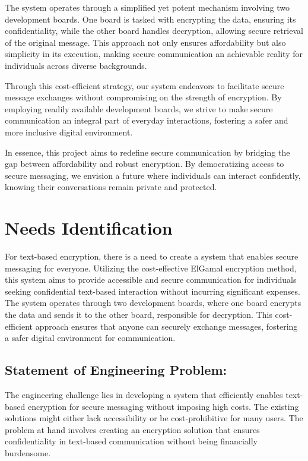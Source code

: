 \documentclass[12pt]{article}
\begin{document}
The system operates through a simplified yet potent mechanism involving two development boards. One board is tasked with encrypting the data, ensuring its confidentiality, while the other board handles decryption, allowing secure retrieval of the original message. This approach not only ensures affordability but also simplicity in its execution, making secure communication an achievable reality for individuals across diverse backgrounds.

Through this cost-efficient strategy, our system endeavors to facilitate secure message exchanges without compromising on the strength of encryption. By employing readily available development boards, we strive to make secure communication an integral part of everyday interactions, fostering a safer and more inclusive digital environment.

In essence, this project aims to redefine secure communication by bridging the gap between affordability and robust encryption. By democratizing access to secure messaging, we envision a future where individuals can interact confidently, knowing their conversations remain private and protected.


\vskip 20cm
	\section{Needs Identification}

For text-based encryption, there is a need to create a system that enables secure messaging for everyone. Utilizing the cost-effective ElGamal encryption method, this system aims to provide accessible and secure communication for individuals seeking confidential text-based interaction without incurring significant expenses. The system operates through two development boards, where one board encrypts the data and sends it to the other board, responsible for decryption. This cost-efficient approach ensures that anyone can securely exchange messages, fostering a safer digital environment for communication.

	
	\subsection{Statement of Engineering Problem:}
	The engineering challenge lies in developing a system that efficiently enables text-based encryption for secure messaging without imposing high costs. The existing solutions might either lack accessibility or be cost-prohibitive for many users. The problem at hand involves creating an encryption solution that ensures confidentiality in text-based communication without being financially burdensome.
	
\end{document}
